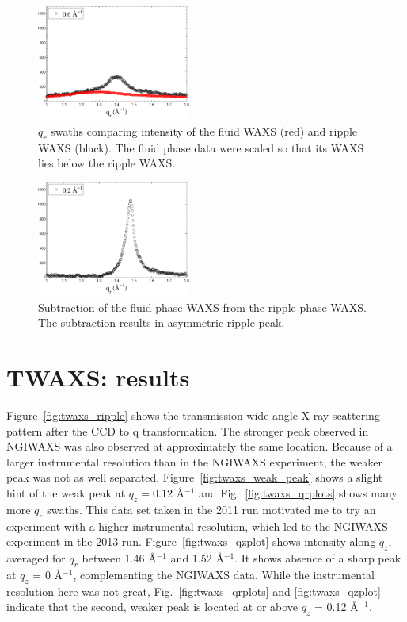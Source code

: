 \begin{figure}[htbp]
  \includegraphics[width=0.45\textwidth]{figures/ripple/NGIWAXS/qr_fluid&ripple5}
  \caption{$q_r$ swaths comparing intensity of the fluid WAXS (red) and ripple WAXS (black).
  The fluid phase data were scaled so that its WAXS lies below the ripple WAXS.}
  \label{fig:fluid&ripple}
\end{figure}

\begin{figure}[htbp]
  \centering
  \includegraphics[width=0.45\textwidth]{figures/ripple/NGIWAXS/qr_ripple-fluid}
  \caption{Subtraction of the fluid phase WAXS from the ripple phase
  WAXS. The subtraction results in asymmetric ripple peak.}
  \label{fig:ripple-fluid}
\end{figure}

\newpage
\section{TWAXS: results}\label{sec:TWAXS_results}
Figure~\ref{fig:twaxs_ripple} shows the transmission wide angle X-ray
scattering pattern after the CCD to q transformation. The stronger
peak observed in NGIWAXS was also observed at approximately the same location.
Because of a larger instrumental resolution than in the NGIWAXS experiment,
the weaker peak was not as well separated. Figure~\ref{fig:twaxs_weak_peak} shows
a slight hint of the weak peak at $q_z=0.12$ \AA$^{-1}$ and 
Fig.~\ref{fig:twaxs_qrplots} shows many more $q_r$ swaths. This
data set taken in the 2011 run motivated me to try an experiment
with a higher instrumental resolution, which led to the NGIWAXS experiment
in the 2013 run. Figure~\ref{fig:twaxs_qzplot} shows intensity along $q_z$,
averaged for $q_r$ between 1.46 \AA$^{-1}$ and 1.52 \AA$^{-1}$. It shows absence of
a sharp peak at $q_z$ = 0 \AA$^{-1}$, complementing the NGIWAXS data.
While the instrumental resolution here was not great, 
Fig.~\ref{fig:twaxs_qrplots} and \ref{fig:twaxs_qzplot} indicate
that the second, weaker peak is located at or above $q_z$ = 0.12 \AA$^{-1}$.

